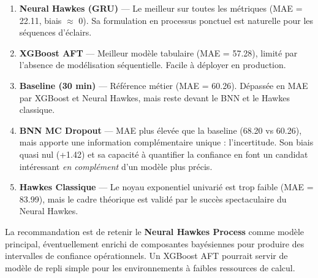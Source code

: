 \documentclass[11pt,a4paper]{article}
\newenvironment{keybox}[1]
  {\begin{tcolorbox}[colback=meteoGray,colframe=meteoBlue,title={\textbf{#1}},
    fonttitle=\small, boxrule=0.6pt, arc=3pt]}
  {\end{tcolorbox}}
\begin{document}
\begin{keybox}{Classement final}
\begin{enumerate}
  \item \textbf{Neural Hawkes (GRU)} — Le meilleur sur toutes les métriques (MAE = 22.11, biais $\approx$ 0). 
  Sa formulation en processus ponctuel est naturelle pour les séquences d'éclairs.
  \item \textbf{XGBoost AFT} — Meilleur modèle tabulaire (MAE = 57.28), limité par l'absence 
  de modélisation séquentielle. Facile à déployer en production.
  \item \textbf{Baseline (30 min)} — Référence métier (MAE = 60.26). Dépassée en MAE par 
  XGBoost et Neural Hawkes, mais reste devant le BNN et le Hawkes classique.
  \item \textbf{BNN MC Dropout} — MAE plus élevée que la baseline (68.20 vs 60.26), mais 
  apporte une information complémentaire unique : l'incertitude. Son biais quasi nul (+1.42) 
  et sa capacité à quantifier la confiance en font un candidat intéressant \textit{en complément} 
  d'un modèle plus précis.
  \item \textbf{Hawkes Classique} — Le noyau exponentiel univarié est trop faible (MAE = 83.99), 
  mais le cadre théorique est validé par le succès spectaculaire du Neural Hawkes.
\end{enumerate}
\end{keybox}

\vspace{1em}

La recommandation est de retenir le \textbf{Neural Hawkes Process} comme modèle principal, 
éventuellement enrichi de composantes bayésiennes pour produire des intervalles de confiance 
opérationnels. Un XGBoost AFT pourrait servir de modèle de repli simple pour les 
environnements à faibles ressources de calcul.
\end{document}
